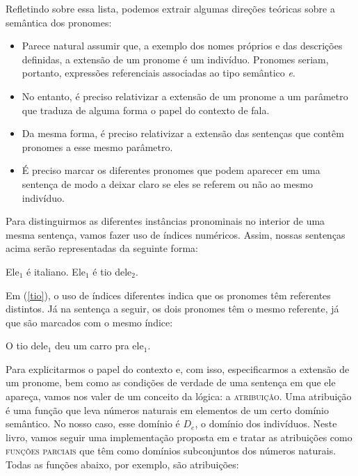 Refletindo sobre essa lista, podemos extrair algumas direções
teóricas sobre a semântica dos pronomes:

\begin{itemize}

\item Parece natural assumir que, a exemplo dos nomes próprios
    e das descrições definidas, a extensão de um pronome é um
    indivíduo. Pronomes seriam, portanto, expressões
    referenciais associadas ao tipo semântico \textit{e}.

\item No entanto, é preciso relativizar a extensão de um
    pronome a um parâmetro que traduza de alguma forma o papel
    do contexto de fala.

\item Da mesma forma, é preciso relativizar a extensão das
    sentenças que contêm pronomes a esse mesmo parâmetro.

\item É preciso marcar os diferentes pronomes que podem
    aparecer em uma sentença de modo a deixar claro se eles se
    referem ou não ao mesmo indivíduo.


\end{itemize}


Para distinguirmos as diferentes instâncias pronominais no
interior de uma mesma sentença, vamos fazer uso de índices
numéricos. Assim, nossas sentenças acima serão representadas da
seguinte forma:

\begin{exe}
\ex Ele$_{1}$ é italiano.\label{ita}
\ex Ele$_{1}$ é tio dele$_{2}$.\label{tio}
\end{exe}

Em (\ref{tio}), o uso de índices diferentes indica que os pronomes
têm referentes distintos. Já na sentença a seguir, os dois pronomes
têm o mesmo referente, já que são marcados com o mesmo índice:

\begin{exe}
\ex O tio dele$_{1}$ deu um carro pra ele$_{1}$.
\end{exe}

Para explicitarmos o papel do contexto e, com isso, especificarmos a extensão de um pronome, bem como as condições de verdade de uma sentença em que ele apareça, vamos nos valer de um conceito da lógica: a \textsc{atribuição}. Uma atribuição é uma função que leva números naturais em elementos de um certo domínio semântico. No nosso caso, esse domínio é $D_{e}$, o domínio dos indivíduos. Neste livro, vamos seguir uma implementação proposta em \cite{heikra98} e tratar as atribuições como \textsc{funções parciais} que têm como domínios subconjuntos dos números naturais. Todas as funções abaixo, por exemplo, são atribuições:

